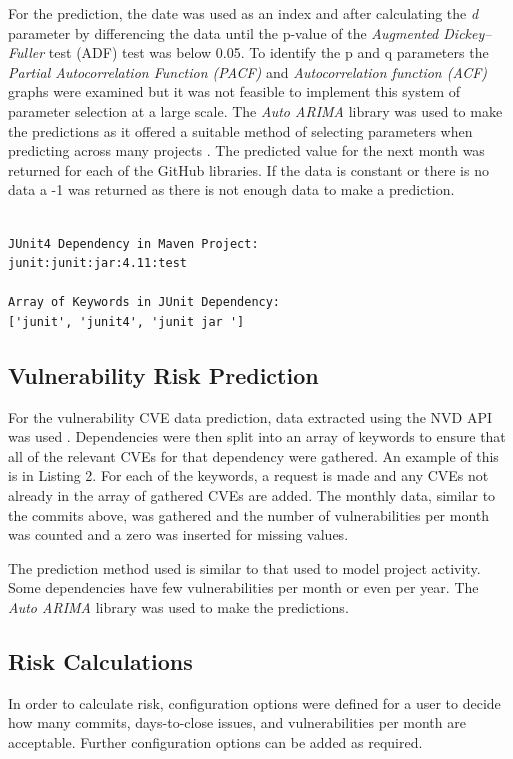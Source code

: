 \documentclass[conference]{IEEEtran}
\begin{document}
For the prediction, the date was used as an index and after calculating the \textit{d} parameter by differencing the data until the p-value of the \textit{Augmented Dickey–Fuller} test (ADF) test was below 0.05. To identify the p and q parameters the \textit{Partial Autocorrelation Function (PACF)} and \textit{Autocorrelation function (ACF)} graphs were examined but it was not feasible to implement this system of parameter selection at a large scale. The \textit{Auto ARIMA} library was used to make the predictions as it offered a suitable method of selecting parameters when predicting across many projects \cite{noauthor_pmdarima_nodate}. The predicted value for the next month was returned for each of the GitHub libraries. If the data is constant or there is no data a -1 was returned as there is not enough data to make a prediction. 

\begin{lstlisting}[caption=Example Keywords]

JUnit4 Dependency in Maven Project:
junit:junit:jar:4.11:test

Array of Keywords in JUnit Dependency:
['junit', 'junit4', 'junit jar ']

\end{lstlisting}

\subsection{Vulnerability Risk Prediction}
For the vulnerability CVE data prediction, data extracted using the NVD API was used \cite{noauthor_vulnerability_nodate}. Dependencies were then split into an array of keywords to ensure that all of the relevant CVEs for that dependency were gathered. An example of this is in Listing 2. For each of the keywords, a request is made and any CVEs not already in the array of gathered CVEs are added. The monthly data, similar to the commits above, was gathered and the number of vulnerabilities per month was counted and a zero was inserted for missing values. 

The prediction method used is similar to that used to model project activity. Some dependencies have few vulnerabilities per month or even per year. The \textit{Auto ARIMA} library was used to make the predictions. 

\subsection{Risk Calculations}
In order to calculate risk, configuration options were defined for a user to decide how many commits, days-to-close issues, and vulnerabilities per month are acceptable. Further configuration options can be added as required. 
\end{document}
